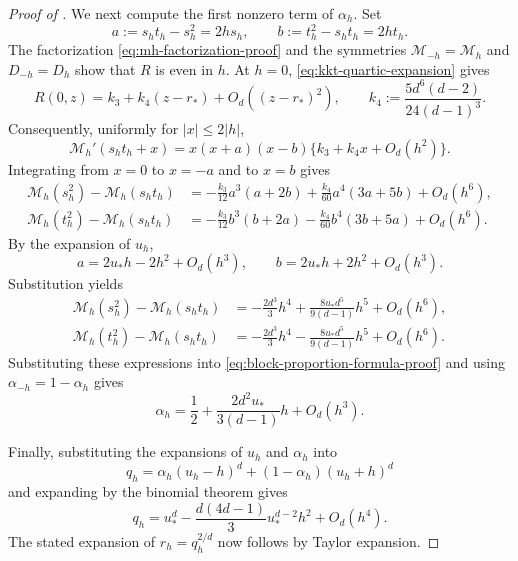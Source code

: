 \begin{proof}[Proof of ]
We next compute the first nonzero term of $\alpha_h$.  Set
\[
  a:=s_ht_h-s_h^2=2hs_h,
  \qquad
  b:=t_h^2-s_ht_h=2ht_h.
\]
The factorization \eqref{eq:mh-factorization-proof} and the symmetries
$\mathcal M_{-h}=\mathcal M_h$ and $D_{-h}=D_h$ show that $R$ is even in
$h$.  At $h=0$, \eqref{eq:kkt-quartic-expansion} gives
\[
  R(0,z)=k_3+k_4(z-r_*)+O_d((z-r_*)^2),
  \qquad
  k_4:=\frac{5d^6(d-2)}{24(d-1)^3}.
\]
Consequently, uniformly for $|x|\le2|h|$,
\[
  \mathcal M_h'(s_ht_h+x)
  =x(x+a)(x-b)\{k_3+k_4x+O_d(h^2)\}.
\]
Integrating from $x=0$ to $x=-a$ and to $x=b$ gives
\begin{align*}
  \mathcal M_h(s_h^2)-\mathcal M_h(s_ht_h)
  &=-\frac{k_3}{12}a^3(a+2b)
    +\frac{k_4}{60}a^4(3a+5b)+O_d(h^6),\\
  \mathcal M_h(t_h^2)-\mathcal M_h(s_ht_h)
  &=-\frac{k_3}{12}b^3(b+2a)
    -\frac{k_4}{60}b^4(3b+5a)+O_d(h^6).
\end{align*}
By the expansion of $u_h$,
\[
  a=2u_*h-2h^2+O_d(h^3),
  \qquad
  b=2u_*h+2h^2+O_d(h^3).
\]
Substitution yields
\begin{align*}
  \mathcal M_h(s_h^2)-\mathcal M_h(s_ht_h)
  &=-\frac{2d^3}{3}h^4
    +\frac{8u_*d^5}{9(d-1)}h^5+O_d(h^6),\\
  \mathcal M_h(t_h^2)-\mathcal M_h(s_ht_h)
  &=-\frac{2d^3}{3}h^4
    -\frac{8u_*d^5}{9(d-1)}h^5+O_d(h^6).
\end{align*}
Substituting these expressions into \eqref{eq:block-proportion-formula-proof} and using
$\alpha_{-h}=1-\alpha_h$ gives
\[
  \alpha_h=\frac12+\frac{2d^2u_*}{3(d-1)}h+O_d(h^3).
\]

Finally, substituting the expansions of $u_h$ and $\alpha_h$ into
\[
  q_h=\alpha_h(u_h-h)^d+(1-\alpha_h)(u_h+h)^d
\]
and expanding by the binomial theorem gives
\[
  q_h=u_*^d-\frac{d(4d-1)}3u_*^{d-2}h^2+O_d(h^4).
\]
The stated expansion of $r_h=q_h^{2/d}$ now follows by Taylor expansion.
\end{proof}
